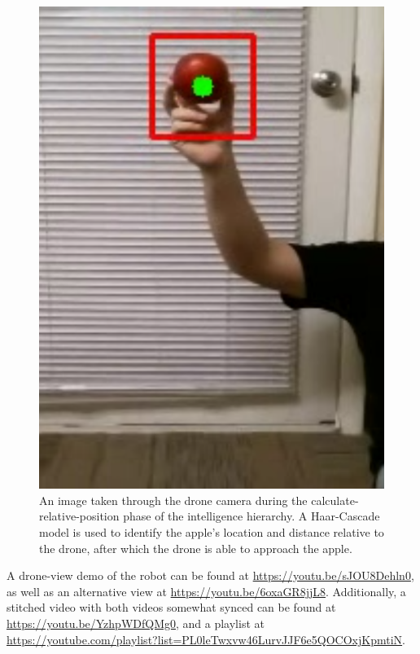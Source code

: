 \begin{figure}[!htb]
    \centering
    \includegraphics[width=\columnwidth,keepaspectratio]
    {./figures/haar-cascade-detection}
    \caption{
        An image taken through the drone camera during the calculate-relative-position phase of the intelligence hierarchy.
        A Haar-Cascade model is used to identify the apple's location and distance relative to the drone, after which the drone is able to approach the apple.
    }
    \label{fig:drone-haar-cascade}
\end{figure}

A drone-view demo of the robot can be found at \mbox{\url{https://youtu.be/sJOU8Dehln0}}, as well as an alternative view at \mbox{\url{https://youtu.be/6oxaGR8jjL8}}.
Additionally, a stitched video with both videos somewhat synced can be found at \mbox{\url{https://youtu.be/YzhpWDfQMg0}}, and a playlist at \url{https://youtube.com/playlist?list=PL0leTwxvw46LurvJJF6e5QOCOxjKpmtiN}.
